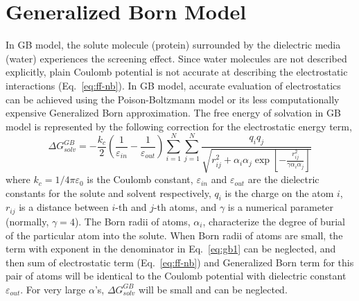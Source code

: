\documentclass[11pt]{book}
\begin{document}
\section{Generalized Born Model}

In GB model, the solute molecule (protein) surrounded by the dielectric media (water) experiences the screening effect. Since water molecules are not described explicitly, plain Coulomb potential is not accurate at describing the electrostatic interactions (Eq.~\ref{eq:ff-nb}). In GB model, accurate evaluation of electrostatics can be achieved using the Poison-Boltzmann model or its less computationally expensive Generalized Born approximation. The free energy of solvation in GB model is represented by the following correction for the electrostatic energy term,
\begin{equation}\label{eq:gb1}
\Delta G_{solv}^{GB}= -\frac{k_{c}}{2}\left(\frac{1}{\varepsilon_{in}}-\frac{1}{\varepsilon_{out}}\right)\sum_{i=1}^N\sum_{j=1}^N\frac{q_{i}q_{j}}{\sqrt{r_{ij}^2+\alpha_{i}\alpha_{j}\exp\left[{-\frac{r_{ij}^2}{\gamma\alpha_{i}\alpha_{j}}}\right]}}
\end{equation}
where $k_{c}=1/4\pi\varepsilon_{0}$ is the Coulomb constant, $\varepsilon_{in}$ and $\varepsilon_{out}$ are the dielectric constants for the solute and solvent respectively, $q_{i}$ is the charge on the atom $i$, $r_{ij}$ is a distance between $i$-th and $j$-th atoms, and $\gamma$ is a numerical parameter (normally, $\gamma$$=$$4$). The Born radii of atoms, $\alpha_{i}$, characterize the degree of burial of the particular atom into the solute. When Born radii of atoms are small, the term with exponent in the denominator in Eq.~\ref{eq:gb1} can be neglected, and then sum of electrostatic term (Eq.~\ref{eq:ff-nb}) and Generalized Born term for this pair of atoms will be identical to the Coulomb potential with dielectric constant $\varepsilon_{out}$. For very large $\alpha$'s, $\Delta G_{solv}^{GB}$ will be small and can be neglected. 
\end{document}
